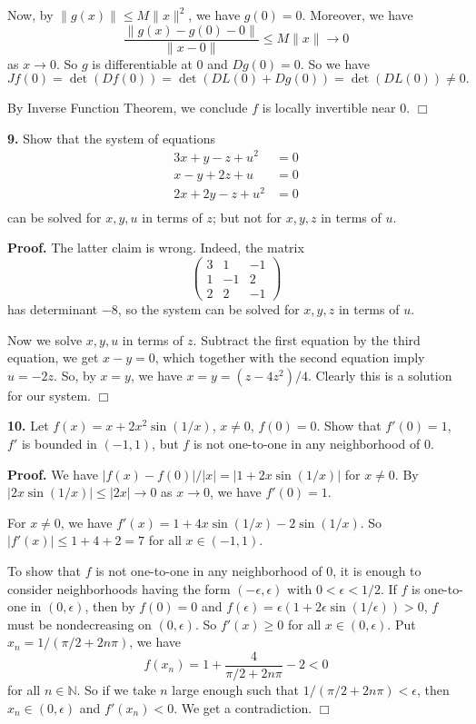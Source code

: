 \documentclass{article}
\begin{document}
Now, by $\|g(x)\| \le M\|x\|^2$, we have $g(0) = 0$. Moreover, we have
\[\frac{\|g(x) - g(0) - 0\|}{\|x - 0\|} \le M\|x\| \to 0\] as $x\to 0$.
So $g$ is differentiable at $0$ and $Dg(0) = 0$. So we have
\[Jf(0) = \det(Df(0)) = \det(DL(0) + Dg(0)) = \det(DL(0)) \ne 0.\]

By Inverse Function Theorem, we conclude $f$ is locally invertible near
$0$. $\Box$

    \textbf{9.} Show that the system of equations \[\begin{aligned}
3x+y -z + u^2 &= 0\\
x-y+2z+u &= 0\\
2x+2y - z + u^2 &= 0\\
\end{aligned}\] can be solved for $x,y,u$ in terms of $z$; but not for
$x,y,z$ in terms of $u$.

    \textbf{Proof.} The latter claim is wrong. Indeed, the matrix
\[\begin{pmatrix}
3 & 1 & -1\\
1 & -1 & 2 \\
2 & 2 & -1
\end{pmatrix}\] has determinant $-8$, so the system can be solved for
$x,y,z$ in terms of $u$.

Now we solve $x,y,u$ in terms of $z$. Subtract the first equation by the
third equation, we get $x - y = 0$, which together with the second
equation imply $u = -2z$. So, by $x = y$, we have $x = y = (z-4z^2)/4$.
Clearly this is a solution for our system. $\Box$

    \textbf{10.} Let $f(x) = x+2x^2\sin(1/x)$, $x\ne 0$, $f(0) = 0$. Show
that $f'(0) = 1$, $f'$ is bounded in $(-1,1)$, but $f$ is not one-to-one
in any neighborhood of $0$.

    \textbf{Proof.} We have $|f(x) - f(0)|/|x| = |1 + 2x\sin(1/x)|$ for
$x\ne 0$. By $|2x\sin(1/x)| \le |2x| \to 0$ as $x\to 0$, we have
$f'(0) = 1$.

For $x\ne 0$, we have $f'(x) = 1 + 4x\sin(1/x) - 2\sin(1/x)$. So
$|f'(x)| \le 1 + 4 + 2 = 7$ for all $x\in (-1,1)$.

To show that $f$ is not one-to-one in any neighborhood of $0$, it is
enough to consider neighborhoods having the form $(-\epsilon,\epsilon)$
with $0 < \epsilon < 1/2$. If $f$ is one-to-one in $(0,\epsilon)$, then
by $f(0) = 0$ and
$f(\epsilon) = \epsilon(1 + 2\epsilon \sin(1/\epsilon)) > 0$, $f$ must
be nondecreasing on $(0, \epsilon)$. So $f'(x) \ge 0$ for all
$x\in (0,\epsilon)$. Put $x_n =1/( \pi/2 + 2n \pi)$, we have
\[f(x_n) = 1 + \frac{4}{\pi/2 + 2n\pi} -2 < 0\] for all
$n\in \mathbb{N}$. So if we take $n$ large enough such that
$1/( \pi/2 + 2n \pi)< \epsilon$, then $x_n \in (0,\epsilon)$ and
$f'(x_n) < 0$. We get a contradiction. $\Box$


    
    
    
    
\end{document}
